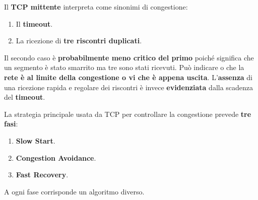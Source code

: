 \documentclass[11pt,a4paper,oneside]{book}
\theoremstyle{definition}
\begin{document}
Il \textbf{TCP mittente} interpreta come sinonimi di congestione:
\begin{enumerate}
	\item Il \textbf{timeout}.
	\item La ricezione di \textbf{tre riscontri duplicati}.
\end{enumerate}
Il secondo caso è \textbf{probabilmente meno critico del primo} poiché significa che un segmento è stato smarrito ma tre sono stati ricevuti. Può indicare o che la \textbf{rete è al limite della congestione o vi che è appena uscita}. L'\textbf{assenza} di una ricezione rapida e regolare dei riscontri è invece \textbf{evidenziata} dalla scadenza del \textbf{timeout}.

\pagebreak

La strategia principale usata da TCP per controllare la congestione prevede \textbf{tre fasi}:
\begin{enumerate}
	\item \textbf{Slow Start}.
	\item \textbf{Congestion Avoidance}.
	\item \textbf{Fast Recovery}.
\end{enumerate}
A ogni fase corrisponde un algoritmo diverso.
\end{document}
